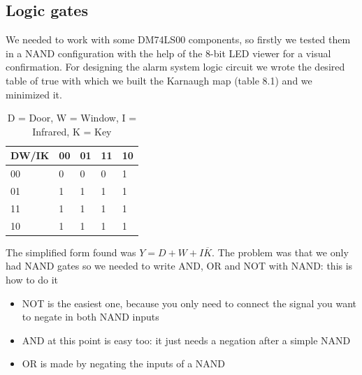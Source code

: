 \subsection{Logic gates}
We needed to work with some DM74LS00 components, so firstly we tested them in a NAND configuration with the help of the 8-bit LED viewer for a visual confirmation.
For designing the alarm system logic circuit we wrote the desired table of true with which we built the Karnaugh map (table 8.1) and we minimized it.

\begin{table}[H]
\centering
\label{my-label}
\begin{tabular}{lllll}
\hline
 DW/IK & 00 & 01 & 11 & 10 \\ \hline
 00    & 0  & 0  & 0  & 1 \\
 01    & 1  & 1  & 1  & 1 \\
 11    & 1  & 1  & 1  & 1 \\ 
 10    & 1  & 1  & 1  & 1 \\ \hline
\end{tabular}\caption{D = Door, W = Window, I = Infrared, K = Key}
\end{table}
The simplified form found was $Y = D + W + I\overline{K}$. The problem was that we only had NAND gates so we needed to write AND, OR and NOT with NAND: this is how to do it
\begin{itemize}
\item NOT is the easiest one, because you only need to connect the signal you want to negate in both NAND inputs
\item AND at this point is easy too: it just needs a negation after a simple NAND
\item OR is made by negating the inputs of a NAND
\end{itemize}

